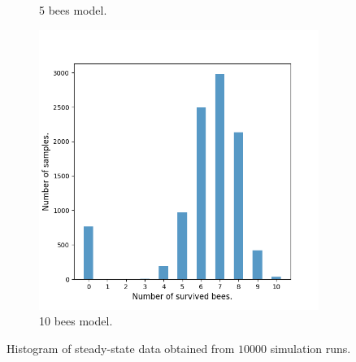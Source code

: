 \begin{figure}[H]
\begin{subfigure}{0.32\textwidth}
        \caption{5 bees model.}
    \end{subfigure}
    \hfill
    \begin{subfigure}{0.32\textwidth}
        \centering
        \includegraphics[width=\linewidth]{figures/bee_10_data.png}
        \caption{10 bees model.}
    \end{subfigure}
    \caption{Histogram of steady-state data obtained from $10000$ simulation runs.}
\end{figure}

